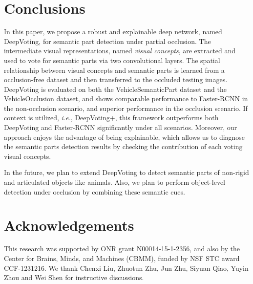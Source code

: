 \documentclass[10pt,twocolumn,letterpaper]{article}
\begin{document}
  \section{Conclusions}
  \label{Conclusions}
  In this paper, we propose a robust and explainable deep network, named DeepVoting, for semantic part detection under partial occlusion. The intermediate visual representations, named {\em visual concepts}, are extracted and used to vote for semantic parts via two convolutional layers. The spatial relationship between visual concepts and semantic parts is learned from a occlusion-free dataset and then transferred to the occluded testing images. DeepVoting is evaluated on both the VehicleSemanticPart dataset and the  VehicleOcclusion dataset, and shows comparable performance to Faster-RCNN in the non-occlusion scenario, and superior performance in the occlusion scenario. If context is utilized, {\em i.e.}, DeepVoting+, this framework outperforms both DeepVoting and Faster-RCNN significantly under all scenarios. Moreover, our approach enjoys the advantage of being explainable, which allows us to diagnose the semantic parts detection results by checking the contribution of each voting visual concepts.

  In the future, we plan to extend DeepVoting to detect semantic parts of non-rigid and articulated objects like animals. Also, we plan to perform object-level detection under occlusion by combining these semantic cues.


  \section*{Acknowledgements}
  \label{Acknowledgements}

  This research was supported by ONR grant N00014-15-1-2356, and also by the Center for Brains, Minds, and Machines (CBMM),
  funded by NSF STC award CCF-1231216. We thank Chenxi Liu, Zhuotun Zhu, Jun Zhu, Siyuan Qiao, Yuyin Zhou and Wei Shen for instructive discussions.


  {\small
  
  
  }
  
\end{document}
